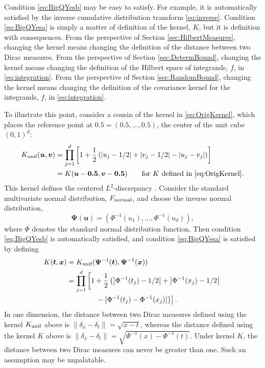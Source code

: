 \documentclass[graybox]{svmult}
\newcommand{\vx}{\boldsymbol{x}}
\newcommand{\vt}{\boldsymbol{t}}
\newcommand{\vu}{\boldsymbol{u}}
\newcommand{\vv}{\boldsymbol{v}}
\newcommand{\vPsi}{\boldsymbol{\Psi}}
\newcommand{\norm}[2][{}]{\ensuremath{\left \lVert #2 \right \rVert}_{#1}}
\newcommand{\unif}{\textup{unif}}
\newcommand{\normal}{\textup{normal}}
\begin{document}
Condition \eqref{eq:BigQYesb} may be easy to satisfy.  For example, it is automatically satisfied by the inverse cumulative distribution transform \eqref{eq:inverse}.  Condition \eqref{eq:BigQYesa} is simply a matter of definition of the kernel, $K$, but it is definition with consequences.  From the perspective of Section \ref{sec:HilbertMeasures}, changing the kernel means changing the definition of the distance between two Dirac measures.  From the perspective of Section \ref{sec:DetermBound}, changing the kernel means changing the definition of the Hilbert space of integrands, $f$, in \eqref{eq:integration}.   From the perspective of Section \ref{sec:RandomBound}, changing the kernel means changing the definition of the covariance kernel for the integrands, $f$, in \eqref{eq:integration}.

To illustrate this point, consider a cousin of the kernel in \eqref{eq:OrigKernel}, which places the reference point at $\boldsymbol{0.5} = (0.5, \ldots, 0.5)$, the center of the unit cube $(0,1)^d$:
\begin{align}
\label{eq:L2kernel}
    K_{\unif}(\vu,\vv) &= \prod_{j=1}^d\left[1+\frac{1}{2}\left(\left|u_j-1/2\right|+ \left|v_j- 1/2 \right|-\left |u_j-v_j \right| \right) \right] \\
    \nonumber
    & = K(\vu - \boldsymbol{0.5}, \vv - \boldsymbol{0.5}) \qquad \text{for $K$ defined in \eqref{eq:OrigKernel}}. 
\end{align}
This kernel defines the centered $L^2$-discrepancy \cite{Hic97a}.
Consider the standard multivariate normal distribution, $F_\normal$, and choose the inverse normal distribution,
\begin{equation} \label{eq:invNormTrans}
    \vPsi(\vu) = (\Phi^{-1}(u_1), \ldots, \Phi^{-1}(u_d)),
\end{equation}
where $\Phi$ denotes the standard normal distribution function.  Then condition \eqref{eq:BigQYesb} is automatically satisfied, and condition \eqref{eq:BigQYesa} is  satisfied by defining
\begin{align}
\nonumber
     K(\vt,\vx) &= K_{\unif}(\vPsi^{-1}(\vt),\vPsi^{-1}(\vx)) \\
     \nonumber
      &= \prod_{j=1}^d\left[1+\frac{1}{2}\left(\left|\Phi^{-1}(t_j)-1/2\right|+ \left|\Phi^{-1}(x_j)- 1/2 \right| \right . \right . \\
      & \qquad \qquad \left.  \left . -\left|\Phi^{-1}(t_j)-\Phi^{-1}(x_j)\right|\right)\right].
\end{align}
In one dimension, the distance between two Dirac measures defined using the kernel $K_\unif$ above is $\norm{\delta_{x} - \delta_{t}} = \sqrt{x-t}$, whereas the distance defined using the kernel $K$ above is $\norm{\delta_{x} - \delta_{t}} = \sqrt{\Phi^{-1}(x)-\Phi^{-1}(t)}$.  Under kernel $K$, the distance between two Dirac measures can never be greater than one.  Such an assumption may be unpalatable.
\end{document}
